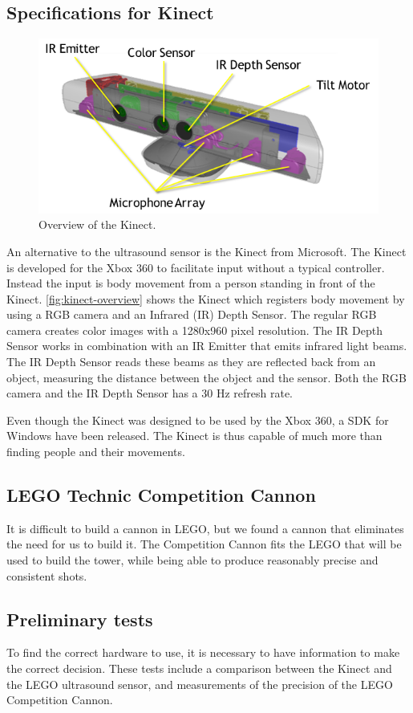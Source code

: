 \subsection{Specifications for Kinect}

\begin{figure}[hbtp]
\centering
\includegraphics[width=.7\textwidth]{img/kinect-overview.png}
\caption{Overview of the Kinect\cite{kinectspec}.} 
\label{fig:kinect-overview} 
\end{figure}

An alternative to the ultrasound sensor is the Kinect from Microsoft. The Kinect is developed for the Xbox 360 to facilitate input without a typical controller. Instead the input is body movement from a person standing in front of the Kinect. \autoref{fig:kinect-overview} shows the Kinect which registers body movement by using a RGB camera and an Infrared (IR) Depth Sensor\cite{kinectspec}. The regular RGB camera creates color images with a 1280x960 pixel resolution. The IR Depth Sensor works in combination with an IR Emitter that emits infrared light beams. The IR Depth Sensor reads these beams as they are reflected back from an object, measuring the distance between the object and the sensor. Both the RGB camera and the IR Depth Sensor has a 30 Hz refresh rate.

Even though the Kinect was designed to be used by the Xbox 360, a SDK for Windows have been released. The Kinect is thus capable of much more than finding people and their movements.

\subsection{LEGO Technic Competition Cannon}
It is difficult to build a cannon in LEGO, but we found a cannon that eliminates the need for us to build it. The Competition Cannon fits the LEGO that will be used to build the tower, while being able to produce reasonably precise and consistent shots.

\subsection{Preliminary tests}
To find the correct hardware to use, it is necessary to have information to make the correct decision. These tests include a comparison between the Kinect and the LEGO ultrasound sensor, and measurements of the precision of the LEGO Competition Cannon.

